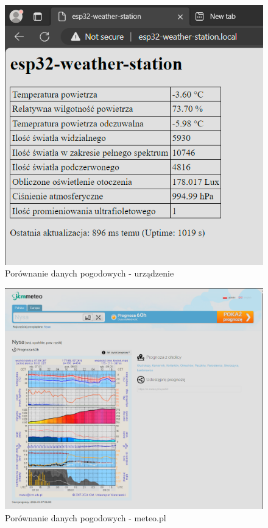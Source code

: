 \documentclass[12pt,a4paper]{article}
\begin{document}
\begin{figure}[H]
    \centering
    \includegraphics[width=\textwidth]{test-outside-site.png}
    \caption{Porównanie danych pogodowych - urządzenie}
    \label{test-outside-site}
\end{figure}

\begin{figure}[H]
    \centering
    \includegraphics[width=\textwidth]{test-outside-meteo.pl.png}
    \caption{Porównanie danych pogodowych - meteo.pl}
    \label{test-outside-meteo}
\end{figure}
\end{document}
